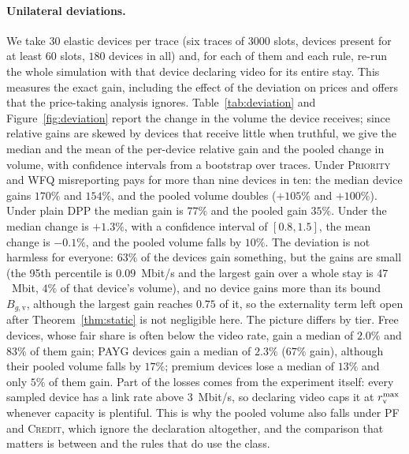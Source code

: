\paragraph{Unilateral deviations.}
We take $30$ elastic devices per trace (six traces of $3000$ slots, devices present for at least $60$ slots, $180$ devices in all) and, for each of them and each rule, re-run the whole simulation with that device declaring video for its entire stay.
This measures the exact gain, including the effect of the deviation on prices and offers that the price-taking analysis ignores.
Table~\ref{tab:deviation} and Figure~\ref{fig:deviation} report the change in the volume the device receives; since relative gains are skewed by devices that receive little when truthful, we give the median and the mean of the per-device relative gain and the pooled change in volume, with confidence intervals from a bootstrap over traces.
Under \textsc{Priority} and \textsc{WFQ} misreporting pays for more than nine devices in ten: the median device gains $170\%$ and $154\%$, and the pooled volume doubles ($+105\%$ and $+100\%$).
Under plain DPP the median gain is $77\%$ and the pooled gain $35\%$.
Under \repay{} the median change is $+1.3\%$, with a confidence interval of $[0.8,1.5]$, the mean change is $-0.1\%$, and the pooled volume falls by $10\%$.
The deviation is not harmless for everyone: $63\%$ of the devices gain something, but the gains are small (the 95th percentile is $0.09$~Mbit/s and the largest gain over a whole stay is $47$~Mbit, $4\%$ of that device's volume), and no device gains more than its bound $B_{g,\mathrm{v}}$, although the largest gain reaches $0.75$ of it, so the externality term left open after Theorem~\ref{thm:static} is not negligible here.
The picture differs by tier. Free devices, whose fair share is often below the video rate, gain a median of $2.0\%$ and $83\%$ of them gain; PAYG devices gain a median of $2.3\%$ ($67\%$ gain), although their pooled volume falls by $17\%$; premium devices lose a median of $13\%$ and only $5\%$ of them gain.
Part of the losses comes from the experiment itself: every sampled device has a link rate above $3$~Mbit/s, so declaring video caps it at $r^{\max}_{\mathrm{v}}$ whenever capacity is plentiful.
This is why the pooled volume also falls under \textsc{PF} and \textsc{Credit}, which ignore the declaration altogether, and the comparison that matters is between \repay{} and the rules that do use the class.

